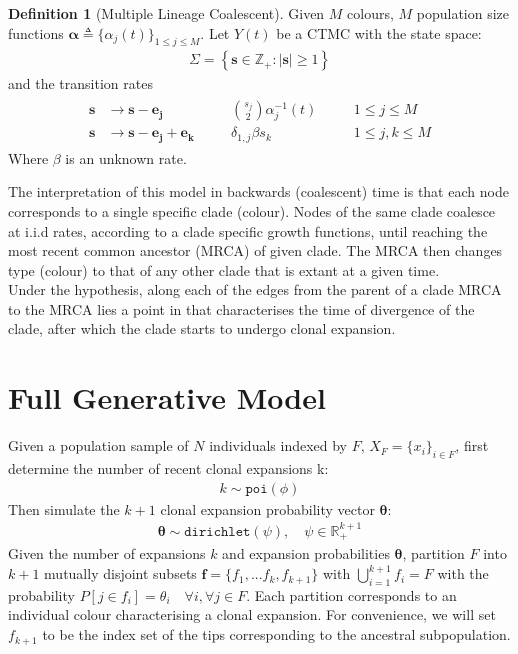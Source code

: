 \documentclass{report}
\newcommand{\R}{\mathbb{R}}
\newcommand{\Z}{\mathbb{Z}}
\theoremstyle{definition}
\newtheorem{definition}{Definition}[section]
\begin{document}
\begin{definition}[Multiple Lineage Coalescent]\label{def:model}
Given $M$ colours, $M$ population size functions $\mathbf{\alpha}\triangleq\{\alpha_j(t)\}_{1\leq j\leq M}$. Let $Y(t)$ be a CTMC with the state space:
\begin{gather}
  \Sigma = \left\{\mathbf{s}\in \Z_+: |\mathbf{s}|\geq1\right\}
\end{gather}
and the transition rates
\begin{gather}\label{eq:multirate}
\begin{align}
\mathbf{s}&\to\mathbf{s}-\mathbf{e_j} &\quad& \binom{s_j}{2}\alpha_j^{-1}(t)&\quad&1\leq j\leq M\\
\mathbf{s}&\to\mathbf{s}-\mathbf{e_j}+\mathbf{e_k}&\quad& \delta_{1,j}\beta s_k&\quad&1\leq j,k\leq M
\end{align}
\end{gather}
Where $\beta$ is an unknown rate.
\end{definition}
The interpretation of this model in backwards (coalescent) time is that each node corresponds to a single specific clade (colour). Nodes of the same clade coalesce at i.i.d rates, according to a clade specific growth functions, until reaching the most recent common ancestor (MRCA) of given clade. The MRCA then changes type (colour) to that of any other clade that is extant at a given time. \\
Under the hypothesis, along each of the edges from the parent of a clade MRCA to the MRCA lies a point in that characterises the time of divergence of the clade, after which the clade starts to undergo clonal expansion.
\section{Full Generative Model}
Given a population sample of $N$ individuals indexed by $F$, $X_F = \{x_i\}_{i \in F}$, first determine the number of recent clonal expansions k:
\begin{gather}
k \sim \texttt{poi}(\phi)
\end{gather}
Then simulate the $k+1$ clonal expansion probability vector $\pmb{\theta}$:
\begin{gather}
\pmb{\theta} \sim \texttt{dirichlet}(\psi), \quad \psi \in \R_+^{k+1} 
\end{gather}
Given the number of expansions $k$ and expansion probabilities $\pmb{\theta}$, partition $F$ into $k+1$ mutually disjoint subsets $\mathbf{f}=\{f_1, ... f_k, f_{k+1}\}$ with $\bigcup\limits_{i=1}^{k+1} f_{i} = F$ with the probability $P[j\in f_{i}]=\theta_i\quad \forall i,\forall j \in F$.  
Each partition corresponds to an individual colour characterising a clonal expansion. For convenience, we will set $f_{k+1}$ to be the index set of the tips corresponding to the ancestral subpopulation.
\end{document}
